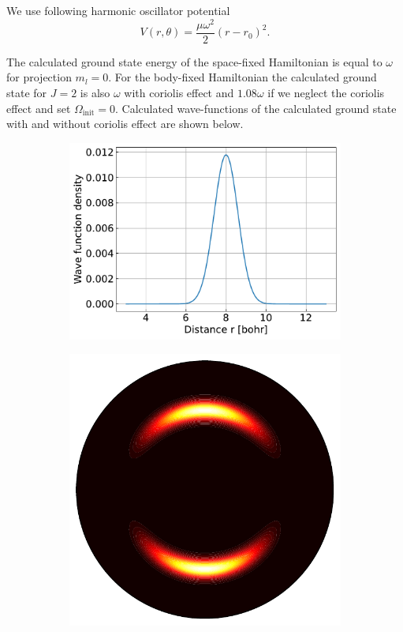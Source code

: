 \documentclass{article}
\begin{document}
    We use following harmonic oscillator potential
    \begin{equation}
        V(r, \theta) = \frac{\mu \omega^2}{2} (r - r_0)^2.
    \end{equation}

    The calculated ground state energy of the space-fixed Hamiltonian is equal to $\omega$ for projection $m_l = 0$.
    For the body-fixed Hamiltonian the calculated ground state for $J = 2$ is also $\omega$ with 
    coriolis effect and $1.08\omega$ if we neglect the coriolis effect and set $\Omega_\text{init} = 0$.
    Calculated wave-functions of the calculated ground state with and without coriolis effect are shown below.

    \begin{figure}[H]
        \centering
        \begin{subfigure}{.4\linewidth}
            \centering
            \includegraphics[width=\linewidth]{harmonic_iso_distance.pdf}
        \end{subfigure}
        \begin{subfigure}{.4\linewidth}
            \centering
            \includegraphics[width=\linewidth]{harmonic_iso_wave.pdf}

\end{subfigure}
\end{figure}
\end{document}
